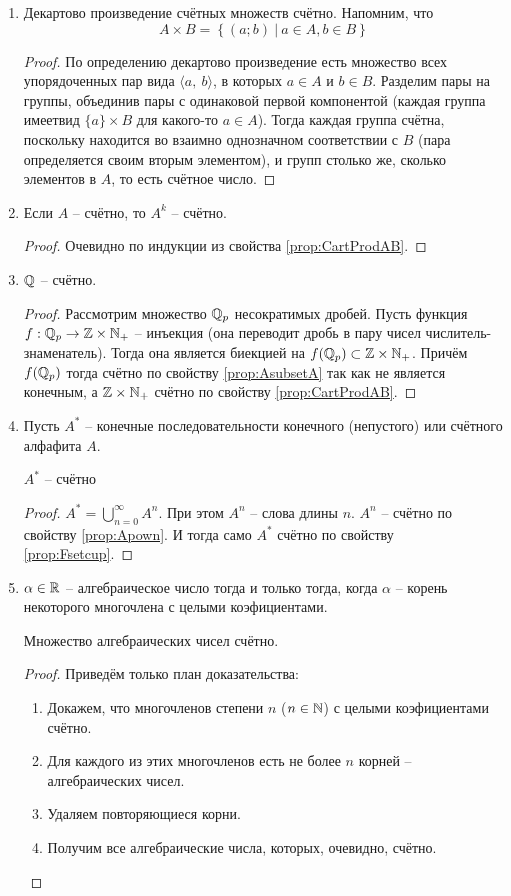 \begin{enumerate}
	\item
	\label{prop:CartProdAB}
	Декартово произведение счётных множеств счётно.
	Напомним, что \[A \times B = \left\{ (a; b)\ |\ a \in A, b \in B \right\}\]
	\begin{proof}
		По определению декартово произведение есть множество всех упорядоченных пар вида $\langle a,\ b\rangle$, в которых $a \in A$ и $b \in B$. Разделим пары на группы, объединив пары с одинаковой первой компонентой (каждая группа имеетвид $\{a\} \times B$ для какого-то $a \in A$). Тогда каждая группа счётна, поскольку находится во взаимно однозначном соответствии с $B$ (пара определяется своим вторым элементом), и групп столько же, сколько элементов в $A$, то есть счётное число.
	\end{proof}
	\item 
	\label{prop:Apown}
	Если $A$ -- счётно, то $A^k$ -- счётно.
	\begin{proof}
		Очевидно по индукции из свойства \ref{prop:CartProdAB}.
	\end{proof}
	\item $\mathbb{Q}$ -- счётно.
	\begin{proof}
		Рассмотрим множество $\mathbb{Q}_p$ несократимых дробей. 
		Пусть функция $f: \mathbb{Q}_p \to \mathbb{Z} \times \mathbb{N}_+$ -- инъекция
		(она переводит дробь в пару чисел числитель-знаменатель).
		Тогда она является биекцией на $f(\mathbb{Q}_p) \subset \mathbb{Z} \times \mathbb{N}_+$. 
		Причём $f(\mathbb{Q}_p)$ тогда счётно по свойству \ref{prop:AsubsetA}
		так как не является конечным, а $\mathbb{Z} \times \mathbb{N}_+$ счётно
		по свойству \ref{prop:CartProdAB}.
	\end{proof}
	\item Пусть $A^*$ -- конечные последовательности конечного (непустого) или 
	счётного алфафита $A$.
	
	\statement $A^*$ -- счётно
	\begin{proof}
		$A^* = \bigcup\limits_{n=0}^{\infty} A^n$. При этом $A^n$ -- слова длины $n$.
		$A^n$ -- счётно по свойству \ref{prop:Apown}. И тогда само $A^*$ счётно
		по свойству \ref{prop:Fsetcup}.
	\end{proof}
	\item {} $\alpha \in \mathbb{R}$ -- алгебраическое число тогда и только тогда, 
	когда $\alpha$ -- корень некоторого многочлена с целыми коэфициентами.
	
	\statement Множество алгебраических чисел счётно.
	\begin{proof}
		Приведём только план доказательства:
		\begin{enumerate}
			\item Докажем, что многочленов степени $n$ ($n \in \mathbb{N}$) с целыми коэфициентами счётно.
			\item Для каждого из этих многочленов есть не более $n$ корней --
			алгебраических чисел.
			\item Удаляем повторяющиеся корни.
			\item Получим все алгебраические числа, которых, очевидно, 
			счётно.
		\end{enumerate}
	\end{proof}
\end{enumerate}

